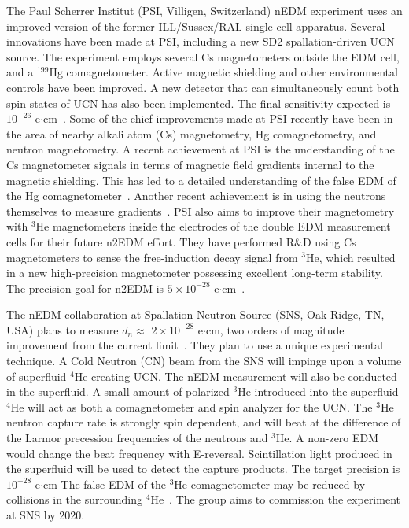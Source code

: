 The Paul Scherrer Institut (PSI, Villigen, Switzerland) nEDM experiment uses an improved version of the former ILL/Sussex/RAL single-cell apparatus. Several innovations have been made at PSI, including a new SD2 spallation-driven UCN source. The experiment employs several Cs magnetometers outside the EDM cell, and a $^{199}\mathrm{Hg}$ comagnetometer. Active magnetic shielding and other environmental controls have been improved. A new detector that can simultaneously count both spin states of UCN has also been implemented. The final sensitivity expected is $\mathrm{10^{-26}}$ e$\cdot$cm~\cite{psi}. Some of the chief improvements made at PSI recently have been in the area of nearby alkali atom (Cs) magnetometry, Hg comagnetometry, and neutron magnetometry. A recent achievement at PSI is the understanding of the Cs magnetometer signals in terms of magnetic field gradients internal to the magnetic shielding. This has led to a detailed understanding of the false EDM of the Hg comagnetometer~\cite{psi_falseEDM}. Another recent achievement is in using the neutrons themselves to measure gradients~\cite{psi_n_gradient}. PSI also aims to improve their magnetometry with $^3\mathrm{He}$ magnetometers inside the electrodes of the double EDM measurement cells for their future n2EDM effort. They have performed R$\&$D using Cs magnetometers to sense the free-induction decay signal from $^3\mathrm{He}$, which resulted in a new high-precision magnetometer possessing excellent long-term stability\cite{psi_magnetometer}. The precision goal for n2EDM is $5 \times 10^{-28}$ e$\cdot$cm~\cite{psi_n2edm_nEDM-workshop,psi_n2edm_PPNS-workshop}.

The nEDM collaboration at Spallation Neutron Source (SNS, Oak Ridge, TN, USA) plans to measure $d_n\approx$ $2\times10^{-28}$ e$\cdot$cm, two orders of magnitude improvement from the current limit~\cite{sns_lim}. They plan to use a unique experimental technique. A Cold Neutron (CN) beam from the SNS will impinge upon a volume of superfluid $^4\mathrm{He}$ creating UCN. The nEDM measurement will also be conducted in the superfluid. A small amount of polarized $^3\mathrm{He}$ introduced into the superfluid $^4\mathrm{He}$ will act as both a comagnetometer and spin analyzer for the UCN. The $^3\mathrm{He}$ neutron capture rate is strongly spin dependent, and will beat at the difference of the Larmor precession frequencies of the neutrons and $^3\mathrm{He}$. A non-zero EDM would change the beat frequency with E-reversal. Scintillation light produced in the superfluid will be used to detect the capture products. The target precision is $10^{-28}$ e$\cdot$cm The false EDM of the $^3\mathrm{He}$ comagnetometer may be reduced by collisions in the surrounding $^4\mathrm{He}$~\cite{sns_false_edm}. The group aims to commission the experiment at SNS by 2020.


